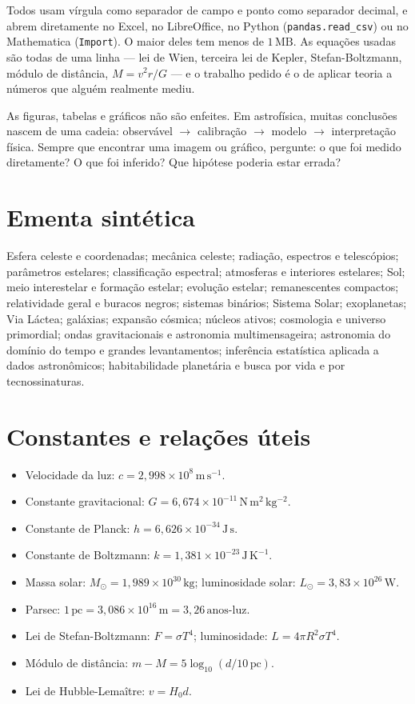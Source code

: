 \documentclass[11pt,a4paper]{article}
\begin{document}
Todos usam vírgula como separador de campo e ponto como separador decimal, e abrem diretamente no Excel, no LibreOffice, no Python (\texttt{pandas.read\_csv}) ou no Mathematica (\texttt{Import}). O maior deles tem menos de $1\,\mathrm{MB}$. As equações usadas são todas de uma linha --- lei de Wien, terceira lei de Kepler, Stefan-Boltzmann, módulo de distância, $M=v^2r/G$ --- e o trabalho pedido é o de aplicar teoria a números que alguém realmente mediu.

As figuras, tabelas e gráficos não são enfeites. Em astrofísica, muitas conclusões nascem de uma cadeia: observável $\rightarrow$ calibração $\rightarrow$ modelo $\rightarrow$ interpretação física. Sempre que encontrar uma imagem ou gráfico, pergunte: o que foi medido diretamente? O que foi inferido? Que hipótese poderia estar errada?

\section*{Ementa sintética}
Esfera celeste e coordenadas; mecânica celeste; radiação, espectros e telescópios; parâmetros estelares; classificação espectral; atmosferas e interiores estelares; Sol; meio interestelar e formação estelar; evolução estelar; remanescentes compactos; relatividade geral e buracos negros; sistemas binários; Sistema Solar; exoplanetas; Via Láctea; galáxias; expansão cósmica; núcleos ativos; cosmologia e universo primordial; ondas gravitacionais e astronomia multimensageira; astronomia do domínio do tempo e grandes levantamentos; inferência estatística aplicada a dados astronômicos; habitabilidade planetária e busca por vida e por tecnossinaturas.

\section*{Constantes e relações úteis}
\begin{itemize}
\item Velocidade da luz: $c=2{,}998\times10^8\,\mathrm{m\,s^{-1}}$.
\item Constante gravitacional: $G=6{,}674\times10^{-11}\,\mathrm{N\,m^2\,kg^{-2}}$.
\item Constante de Planck: $h=6{,}626\times10^{-34}\,\mathrm{J\,s}$.
\item Constante de Boltzmann: $k=1{,}381\times10^{-23}\,\mathrm{J\,K^{-1}}$.
\item Massa solar: $M_\odot=1{,}989\times10^{30}\,\mathrm{kg}$; luminosidade solar: $L_\odot=3{,}83\times10^{26}\,\mathrm{W}$.
\item Parsec: $1\,\mathrm{pc}=3{,}086\times10^{16}\,\mathrm{m}=3{,}26\,\mathrm{anos\text{-}luz}$.
\item Lei de Stefan-Boltzmann: $F=\sigma T^4$; luminosidade: $L=4\pi R^2\sigma T^4$.
\item Módulo de distância: $m-M=5\log_{10}(d/10\,\mathrm{pc})$.
\item Lei de Hubble-Lemaître: $v=H_0 d$.
\end{itemize}
\end{document}
